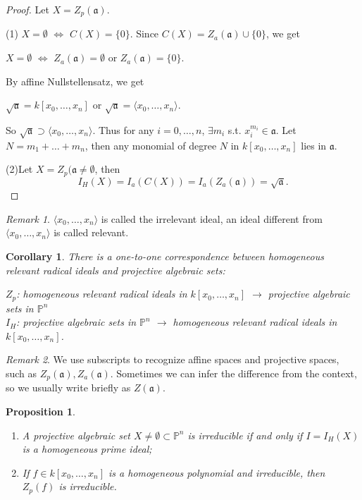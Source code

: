 \documentclass{amsart}
\theoremstyle{plain}
\newtheorem{corollary}{Corollary}
\newtheorem{proposition}{Proposition}
\theoremstyle{definition}
\theoremstyle{remark}
\newtheorem*{remark}{Remark}
\numberwithin{equation}{section}
\begin{document}
\begin{proof}
	Let $ X=Z_p(\mathfrak{a}) $.
	
	(1) $ X=\emptyset $ $ \Leftrightarrow $ $ C(X)=\{ 0 \} $. Since $ C(X)=Z_a(\mathfrak{a})\cup \{0\} $, we get
	\begin{center}
		$ X=\emptyset $ $ \Leftrightarrow $ $ Z_a(\mathfrak{a})=\emptyset $ or $ Z_a(\mathfrak{a})=\{0\} $.
	\end{center}
	By affine Nullstellensatz, we get
	\begin{center}
		$ \sqrt{\mathfrak{a}}=k[x_0,\dots,x_n] $ or $ \sqrt{\mathfrak{a}}=\langle x_0,\dots,x_n\rangle $.
	\end{center}
	So $ \sqrt{\mathfrak{a}}\supset \langle x_0,\dots,x_n\rangle $. Thus for any $ i=0,\dots,n $, $ \exists m_i $ s.t. $ x_i^{m_i}\in \mathfrak{a} $. Let $ N=m_1+\dots+m_n $, then any monomial of degree $ N $ in $ k[x_0,\dots,x_n] $ lies in $ \mathfrak{a} $.
	
	(2)Let $ X=Z_p(\mathfrak{a}\neq \emptyset $, then
	\begin{equation}
	I_H(X)=I_a(C(X))=I_a(Z_a(\mathfrak{a}))=\sqrt{\mathfrak{a}}.
	\end{equation}
\end{proof}
\begin{remark}
	$ \langle x_0,\dots,x_n \rangle $ is called the irrelevant ideal, an ideal different from $ \langle x_0,\dots,x_n \rangle $ is called relevant.
\end{remark}
\begin{corollary}
	There is a one-to-one correspondence between homogeneous relevant radical ideals and projective algebraic sets:
	\begin{center}
		$ Z_p $: homogeneous relevant radical ideals in $ k[x_0,\dots,x_n] $ $ \to $  projective algebraic sets in  $ \mathbb{P}^n $\\
		$ I_H $: projective algebraic sets in $ \mathbb{P}^n $ $ \to $ homogeneous relevant radical ideals in $ k[x_0,\dots,x_n] $.
	\end{center}
\end{corollary}
\begin{remark}
	We use subscripts to recognize affine spaces and projective spaces, such as $ Z_p(\mathfrak{a}),Z_a(\mathfrak{a}) $. Sometimes we can infer the difference from the context, so we usually write briefly as $ Z(\mathfrak{a}) $.
\end{remark}
\begin{proposition}
	\begin{enumerate}
		\item A projective algebraic set $ X\neq \emptyset\subset \mathbb{P}^n $ is irreducible if and only if $ I=I_H(X) $ is a homogeneous prime ideal;
		\item If $ f\in k[x_0,\dots,x_n] $ is a homogeneous polynomial and irreducible, then $ Z_p(f) $ is irreducible.
	\end{enumerate}
\end{proposition}
\end{document}
